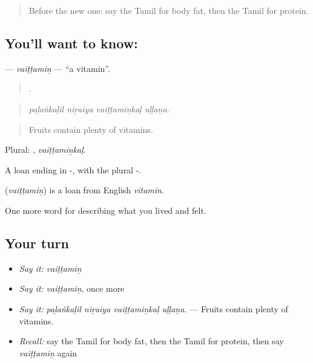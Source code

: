 \begin{quote}
Before the new one: say the Tamil for body fat, then the Tamil for protein.
\end{quote}

\subsection*{You'll want to know: }
\textbf{} — \emph{vaiṭṭamiṉ} — \textquotedblleft{}a vitamin\textquotedblright{}.

\begin{quote}
   .
\end{quote}

\begin{quote}
\emph{paḻaṅkaḷil niṟaiya vaiṭṭamiṉkaḷ uḷḷaṉa.}
\end{quote}

\begin{quote}
Fruits contain plenty of vitamins.
\end{quote}

Plural: , \emph{vaiṭṭamiṉkaḷ}.

A loan ending in -, with the plural -.

\begin{cousinweb}
\textbf{} (\emph{vaiṭṭamiṉ}) is a loan from English \emph{vitamin}.
\end{cousinweb}

\begin{grammarlens}[title={What you've built}]
One more word for describing what you lived and felt.
\end{grammarlens}

\subsection*{Your turn}
\begin{itemize}
\raggedright
  \item \emph{Say it:} \emph{vaiṭṭamiṉ}
  \item \emph{Say it:} \emph{vaiṭṭamiṉ}, once more
  \item \emph{Say it:} \emph{paḻaṅkaḷil niṟaiya vaiṭṭamiṉkaḷ uḷḷaṉa.} — Fruits contain plenty of vitamins.
  \item \emph{Recall:} say the Tamil for body fat, then the Tamil for protein, then say \emph{vaiṭṭamiṉ} again
\end{itemize}

